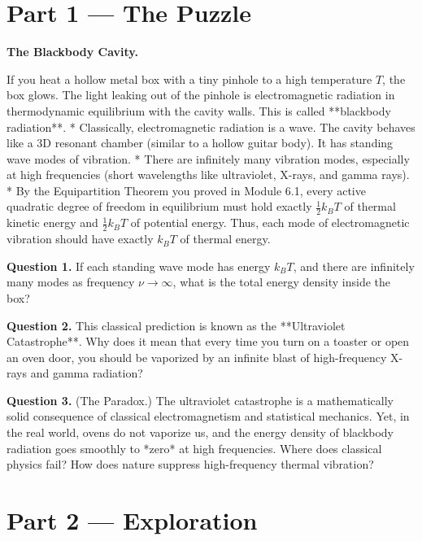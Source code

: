 \documentclass[12pt, a4paper, twoside]{book}
\begin{document}
\section{Part 1 --- The Puzzle}

\begin{puzzlebox}
\textbf{The Blackbody Cavity.}

If you heat a hollow metal box with a tiny pinhole to a high temperature $T$, the box glows. The light leaking out of the pinhole is electromagnetic radiation in thermodynamic equilibrium with the cavity walls. This is called **blackbody radiation**.
* Classically, electromagnetic radiation is a wave. The cavity behaves like a 3D resonant chamber (similar to a hollow guitar body). It has standing wave modes of vibration.
* There are infinitely many vibration modes, especially at high frequencies (short wavelengths like ultraviolet, X-rays, and gamma rays).
* By the Equipartition Theorem you proved in Module 6.1, every active quadratic degree of freedom in equilibrium must hold exactly $\frac{1}{2} k_B T$ of thermal kinetic energy and $\frac{1}{2} k_B T$ of potential energy. Thus, each mode of electromagnetic vibration should have exactly $k_B T$ of thermal energy.

\medskip
\textbf{Question 1.} If each standing wave mode has energy $k_B T$, and there are infinitely many modes as frequency $\nu \to \infty$, what is the total energy density inside the box?

\textbf{Question 2.} This classical prediction is known as the **Ultraviolet Catastrophe**. Why does it mean that every time you turn on a toaster or open an oven door, you should be vaporized by an infinite blast of high-frequency X-rays and gamma radiation?

\textbf{Question 3.} (The Paradox.) The ultraviolet catastrophe is a mathematically solid consequence of classical electromagnetism and statistical mechanics. Yet, in the real world, ovens do not vaporize us, and the energy density of blackbody radiation goes smoothly to *zero* at high frequencies. Where does classical physics fail? How does nature suppress high-frequency thermal vibration?
\end{puzzlebox}

\newpage

\section{Part 2 --- Exploration}
\end{document}
